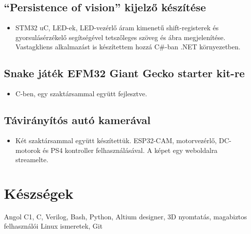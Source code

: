 \documentclass{article}
\begin{document}
\subsection{\enquote{Persistence of vision} kijelző készítése}
\begin{itemize}
  \item STM32 uC, LED-ek, LED-vezérlő áram kimenetű shift-registerek és 
gyorsulásérzékelő segítségével tetszőleges szöveg és ábra megjelenítése. Vastagkliens alkalmazást is készítettem hozzá C\#-ban .NET környezetben.
\end{itemize}

\subsection{Snake játék EFM32 Giant Gecko starter kit-re}
\begin{itemize}
  \item C-ben, egy szaktársammal együtt fejlesztve.
\end{itemize}

\subsection{Távirányítós autó kamerával}
\begin{itemize}
  \item Két szaktársammal együtt készítettük. ESP32-CAM, motorvezérlő, DC-motorok és PS4 kontroller felhasználásával. A képet egy weboldalra streamelte.
\end{itemize}

\section{\faCogs\enspace Készségek}
\begin{description}
  \item Angol C1, C, Verilog, Bash, Python, Altium designer, 3D nyomtatás, magabiztos felhasználói Linux ismeretek, Git
\end{description}
\end{document}
